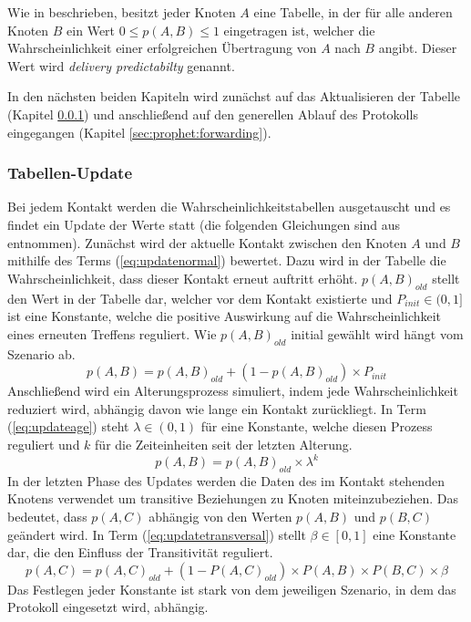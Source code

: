\documentclass[a4paper, 12pt]{article}
\begin{document}
Wie in \cite{lindgren2003probabilistic} beschrieben, besitzt jeder Knoten $A$ eine Tabelle, in der für alle anderen Knoten $B$ ein Wert $0 \leq p(A,B) \leq 1$ eingetragen ist, welcher die Wahrscheinlichkeit einer erfolgreichen Übertragung von $A$ nach $B$ angibt. Dieser Wert wird \emph{delivery predictabilty} genannt.

In den nächsten beiden Kapiteln wird zunächst auf das Aktualisieren der Tabelle (Kapitel \ref{sec:prophet:tabellenupdate}) und anschließend auf den generellen Ablauf des Protokolls eingegangen (Kapitel \ref{sec:prophet:forwarding}).

\subsubsection{Tabellen-Update}
\label{sec:prophet:tabellenupdate}
Bei jedem Kontakt werden die Wahrscheinlichkeitstabellen ausgetauscht und es findet ein Update der Werte statt (die folgenden Gleichungen sind aus \cite{lindgren2003probabilistic} entnommen).
Zunächst wird der aktuelle Kontakt zwischen den Knoten $A$ und $B$ mithilfe des Terms (\ref{eq:updatenormal}) bewertet. Dazu wird in der Tabelle die Wahrscheinlichkeit, dass dieser Kontakt erneut auftritt erhöht.
$p(A,B)_{old}$ stellt den Wert in der Tabelle dar, welcher vor dem Kontakt existierte und $P_{init} \in (0,1]$ ist eine Konstante, welche die positive Auswirkung auf die Wahrscheinlichkeit eines erneuten Treffens reguliert. Wie $p(A,B)_{old}$ initial gewählt wird hängt vom Szenario ab.
\begin{equation}
	\label{eq:updatenormal}
	p(A,B) = p(A,B)_{old} + (1-p(A,B)_{old}) \times P_{init}
\end{equation}
Anschließend wird ein Alterungsprozess simuliert, indem jede Wahrscheinlichkeit reduziert wird, abhängig davon wie lange ein Kontakt zurückliegt. In Term (\ref{eq:updateage}) steht $\lambda \in (0,1)$ für eine Konstante, welche diesen Prozess reguliert und $k$ für die Zeiteinheiten seit der letzten Alterung.
\begin{equation}
	\label{eq:updateage}
	p(A,B) = p(A,B)_{old} \times \lambda^k
\end{equation}
In der letzten Phase des Updates werden die Daten des im Kontakt stehenden Knotens verwendet um transitive Beziehungen zu Knoten miteinzubeziehen. Das bedeutet, dass $p(A,C)$ abhängig von den Werten $p(A,B)$ und $p(B,C)$ geändert wird.
In Term (\ref{eq:updatetransversal}) stellt $\beta \in [0,1]$ eine Konstante dar, die den Einfluss der Transitivität reguliert.
\begin{equation}
	\label{eq:updatetransversal}
	p(A,C) = p(A,C)_{old} + (1-P(A,C)_{old}) \times P(A,B) \times P(B,C) \times \beta
\end{equation}
Das Festlegen jeder Konstante ist stark von dem jeweiligen Szenario, in dem das Protokoll eingesetzt wird, abhängig.
\end{document}
